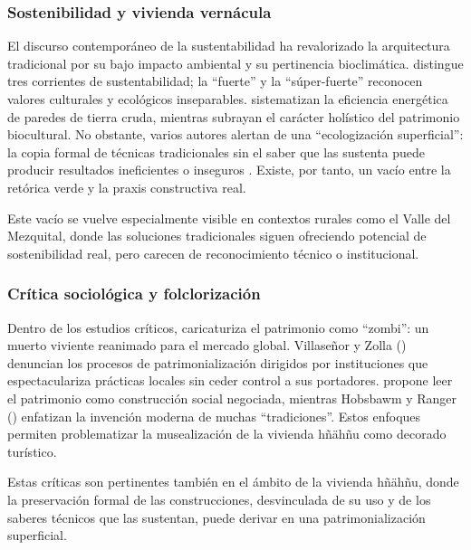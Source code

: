 \subsubsection{Sostenibilidad y vivienda vernácula}

El discurso contemporáneo de la sustentabilidad ha revalorizado la arquitectura tradicional por su bajo impacto ambiental y su pertinencia bioclimática. \cite{gudynas2010desarrollo} distingue tres corrientes de sustentabilidad; la ``fuerte'' y la ``súper-fuerte'' reconocen valores culturales y ecológicos inseparables. \cite{larraga2014sust} sistematizan la eficiencia energética de paredes de tierra cruda, mientras \cite{chang2010patrimonio} subrayan el carácter holístico del patrimonio biocultural.  No obstante, varios autores alertan de una ``ecologización superficial'': la copia formal de técnicas tradicionales sin el saber que las sustenta puede producir resultados ineficientes o inseguros \cite{gandara2000, sanchez2016adobeBTC}.  Existe, por tanto, un vacío entre la retórica verde y la praxis constructiva real.

Este vacío se vuelve especialmente visible en contextos rurales como el Valle del Mezquital, donde las soluciones tradicionales siguen ofreciendo potencial de sostenibilidad real, pero carecen de reconocimiento técnico o institucional.

\subsubsection{Crítica sociológica y folclorización}

Dentro de los estudios críticos, \cite{i2008zombi} caricaturiza el patrimonio como ``zombi'': un muerto viviente reanimado para el mercado global.  Villaseñor y Zolla (\citeyear{villasenor2012patrimonio}) denuncian los procesos de patrimonialización dirigidos por instituciones que espectaculariza prácticas locales sin ceder control a sus portadores. \cite{malavassi2017patrimonio} propone leer el patrimonio como construcción social negociada, mientras Hobsbawm y Ranger (\citeyear{hobsbawm1983inventar}) enfatizan la invención moderna de muchas ``tradiciones''.  Estos enfoques permiten problematizar la musealización de la vivienda hñähñu como decorado turístico.

Estas críticas son pertinentes también en el ámbito de la vivienda hñähñu, donde la preservación formal de las construcciones, desvinculada de su uso y de los saberes técnicos que las sustentan, puede derivar en una patrimonialización superficial.


